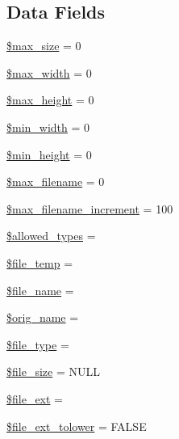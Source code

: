 \subsection*{Data Fields}
\begin{DoxyCompactItemize}
\item 
\mbox{\hyperlink{class_c_i___upload_a3fec414be9f76cb7ba77ed79b784de62}{\$max\+\_\+size}} = 0
\item 
\mbox{\hyperlink{class_c_i___upload_a7f6a5db40a5fd00c8babbd37480b00fc}{\$max\+\_\+width}} = 0
\item 
\mbox{\hyperlink{class_c_i___upload_a7f2b56fde8cdd8907f9228149fc4b9bc}{\$max\+\_\+height}} = 0
\item 
\mbox{\hyperlink{class_c_i___upload_ad481f92f436b46aa9e400c3350c1971d}{\$min\+\_\+width}} = 0
\item 
\mbox{\hyperlink{class_c_i___upload_ade5021b056dd0ca6a46b293851ee8347}{\$min\+\_\+height}} = 0
\item 
\mbox{\hyperlink{class_c_i___upload_a7c8c80e453111c2521e355b83331a9df}{\$max\+\_\+filename}} = 0
\item 
\mbox{\hyperlink{class_c_i___upload_a95a9bbb06c792949b16879a515366b73}{\$max\+\_\+filename\+\_\+increment}} = 100
\item 
\mbox{\hyperlink{class_c_i___upload_a2e0df9e15179e2db66d161206842d6c0}{\$allowed\+\_\+types}} = \textquotesingle{}\textquotesingle{}
\item 
\mbox{\hyperlink{class_c_i___upload_a8b49917820e40f0b8956d95c1fd6ee6e}{\$file\+\_\+temp}} = \textquotesingle{}\textquotesingle{}
\item 
\mbox{\hyperlink{class_c_i___upload_a59bf132c77b5bee5adff2098cc2a6fbc}{\$file\+\_\+name}} = \textquotesingle{}\textquotesingle{}
\item 
\mbox{\hyperlink{class_c_i___upload_a2704f7723b97b03285de219442ae3e2b}{\$orig\+\_\+name}} = \textquotesingle{}\textquotesingle{}
\item 
\mbox{\hyperlink{class_c_i___upload_a6210dfa92a7e2e5e9db1aa2337ce4cd1}{\$file\+\_\+type}} = \textquotesingle{}\textquotesingle{}
\item 
\mbox{\hyperlink{class_c_i___upload_a5b3595a69dbf686d879bd009ec9c0317}{\$file\+\_\+size}} = N\+U\+LL
\item 
\mbox{\hyperlink{class_c_i___upload_a65b080519869bc14d792c1800e3362f5}{\$file\+\_\+ext}} = \textquotesingle{}\textquotesingle{}
\item 
\mbox{\hyperlink{class_c_i___upload_a19d10a169638eedd95a6a85d71146db8}{\$file\+\_\+ext\+\_\+tolower}} = F\+A\+L\+SE

\end{DoxyCompactItemize}

